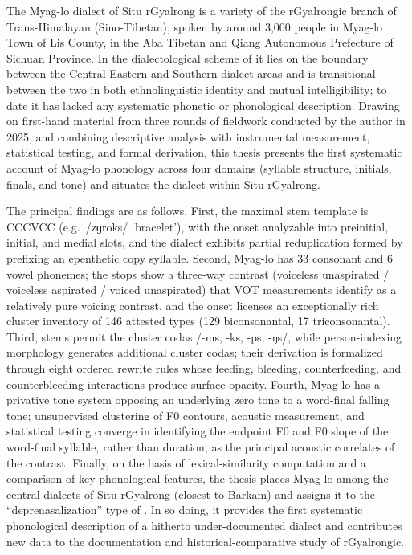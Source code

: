 \documentclass[
    decl-page,  %
    twoside,                %
    cjk-font = win,
    latin-font = none,
  ]{njuthesis}
\begin{document}
\begin{abstract*}
  The Myag-lo dialect of Situ rGyalrong is a variety of the rGyalrongic branch of Trans-Himalayan (Sino-Tibetan), spoken by around 3,000 people in Myag-lo Town of Lis County, in the Aba Tibetan and Qiang Autonomous Prefecture of Sichuan Province. In the dialectological scheme of \textcite{gates2014situ} it lies on the boundary between the Central-Eastern and Southern dialect areas and is transitional between the two in both ethnolinguistic identity and mutual intelligibility; to date it has lacked any systematic phonetic or phonological description. Drawing on first-hand material from three rounds of fieldwork conducted by the author in 2025, and combining descriptive analysis with instrumental measurement, statistical testing, and formal derivation, this thesis presents the first systematic account of Myag-lo phonology across four domains (syllable structure, initials, finals, and tone) and situates the dialect within Situ rGyalrong.
  
  The principal findings are as follows. First, the maximal stem template is CCCVCC (e.g.\ /zɡroks/ `bracelet'), with the onset analyzable into preinitial, initial, and medial slots, and the dialect exhibits partial reduplication formed by prefixing an epenthetic copy syllable. Second, Myag-lo has 33 consonant and 6 vowel phonemes; the stops show a three-way contrast (voiceless unaspirated / voiceless aspirated / voiced unaspirated) that VOT measurements identify as a relatively pure voicing contrast, and the onset licenses an exceptionally rich cluster inventory of 146 attested types (129 biconsonantal, 17 triconsonantal). Third, stems permit the cluster codas /-ms, -ks, -ps, -ŋs/, while person-indexing morphology generates additional cluster codas; their derivation is formalized through eight ordered rewrite rules whose feeding, bleeding, counterfeeding, and counterbleeding interactions produce surface opacity. Fourth, Myag-lo has a privative tone system opposing an underlying zero tone to a word-final falling tone; unsupervised clustering of F0 contours, acoustic measurement, and statistical testing converge in identifying the endpoint F0 and F0 slope of the word-final syllable, rather than duration, as the principal acoustic correlates of the contrast. Finally, on the basis of lexical-similarity computation and a comparison of key phonological features, the thesis places Myag-lo among the central dialects of Situ rGyalrong (closest to Barkam) and assigns it to the ``deprenasalization'' type of \textcite{Gong2018-aw}. In so doing, it provides the first systematic phonological description of a hitherto under-documented dialect and contributes new data to the documentation and historical-comparative study of rGyalrongic.
\end{abstract*}
\end{document}
